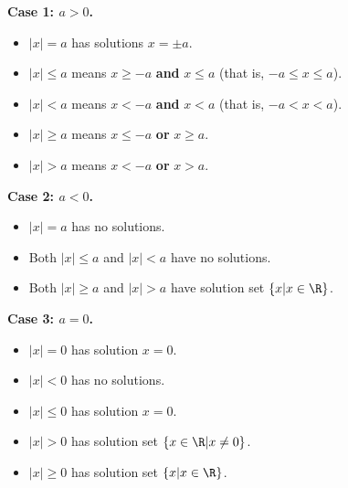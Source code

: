 \medskip
{\bf Case 1: $a>0$.}\vspace{-0.1cm}
\begin{itemize}\setlength{\itemsep}{0 in}
\item $|x|=a$ has solutions $x=\pm a$. 
\item $|x|\leq a$ means $x\geq -a$ {\bf and} $x\leq a$  (that is, $-a\leq x\leq a$). 
\item $|x|<a$ means $x< -a$ {\bf and} $x< a$  (that is, $-a< x< a$). 
\item $|x|\geq a$ means $x\leq -a$ {\bf or} $x\geq a$. 
\item $|x|> a$ means $x< -a$ {\bf or} $x> a$. 
\end{itemize}

{\bf Case 2: $a<0$.}\vspace{-0.1cm}
\begin{itemize}\setlength{\itemsep}{0 in}
\item $|x|=a$ has no solutions. 
\item Both $|x|\leq a$ and $|x|<a$ have no solutions. 
\item Both $|x|\geq a$ and $|x|>a$ have solution set $\{x|x\in\R\}$. 
\end{itemize}

{\bf Case 3: $a=0$.}\vspace{-0.1cm}
\begin{itemize}\setlength{\itemsep}{0 in}
\item $|x|=0$ has solution $x=0$. 
\item $|x|<0$ has no solutions. 
\item $|x|\leq 0$ has solution $x=0$. 
\item $|x|>0$ has solution set $\{x\in\R|x\neq 0\}$. 
\item $|x|\geq 0$ has solution set $\{x|x\in\R\}$.
\end{itemize}